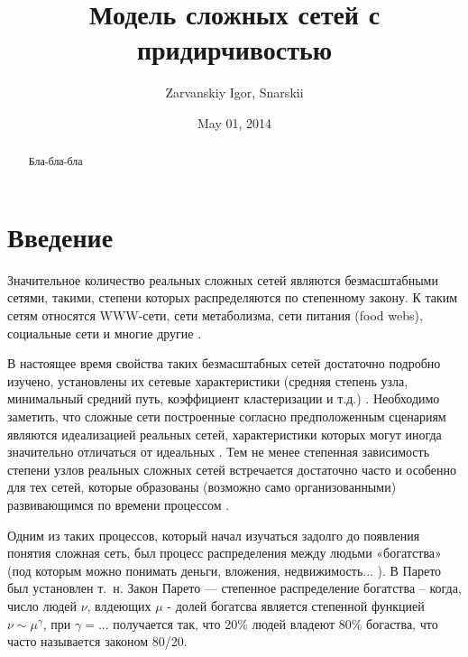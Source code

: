 \documentclass[10pt,aps,pra]{revtex4-1}
\begin{document}
\title{Модель сложных сетей с придирчивостью}
\author{Zarvanskiy Igor, Snarskii}


\date{May 01, 2014}

\begin{abstract}
Бла-бла-бла
\end{abstract}
\maketitle

\linenumbers\par

\section{Введение}

Значительное количество реальных сложных сетей являются безмасштабными сетями, такими, степени которых распределяются по степенному закону. К таким сетям относятся WWW-сети, сети метаболизма, сети питания (food webs), социальные сети и многие другие \cite{Dor2}.

В настоящее время свойства таких безмасштабных сетей достаточно подробно изучено, установлены их сетевые характеристики (средняя степень узла, минимальный средний путь, коэффициент кластеризации и т.д.) \cite{Newman}. Необходимо заметить, что сложные сети построенные согласно предположенным сценариям \cite{AlBa2} являются идеализацией реальных сетей, характеристики которых могут иногда значительно отличаться от идеальных \cite{Newman}. Тем не менее степенная зависимость степени узлов реальных сложных сетей встречается достаточно часто и особенно для тех сетей, которые образованы (возможно само организованными) развивающимся по времени процессом \cite{}.

Одним из таких процессов, который начал изучаться задолго до появления понятия сложная сеть, был процесс распределения между людьми «богатства» (под которым можно понимать деньги, вложения, недвижимость... ). В \cite{Pareto} Парето был установлен т. н. Закон Парето — степенное распределение богатства – когда, число людей $\nu$, влдеющих $\mu$ - долей богатсва является степенной функцией $\nu \sim \mu^\gamma$, при $\gamma=...$ получается так, что 20\% людей владеют 80\% богаства, что часто называется законом 80/20. 
\end{document}
